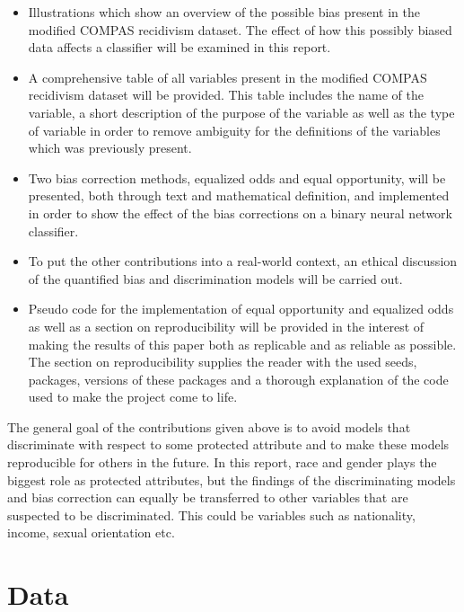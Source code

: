 \documentclass[11pt, fleqn, titlepage]{article}
\begin{document}
	\begin{itemize}
		\item Illustrations which show an overview of the possible bias present in the modified COMPAS recidivism dataset. The effect of how this possibly biased data affects a classifier will be examined in this report. 
		\item A comprehensive table of all variables present in the modified COMPAS recidivism dataset will be provided. This table includes the name of the variable, a short description of the purpose of the variable as well as the type of variable in order to remove ambiguity for the definitions of the variables which was previously present.
		\item Two bias correction methods, equalized odds and equal opportunity, will be presented, both through text and mathematical definition, and implemented in order to show the effect of the bias corrections on a binary neural network classifier.
		\item To put the other contributions into a real-world context, an ethical discussion of the quantified bias and discrimination models will be carried out.
		\item Pseudo code for the implementation of equal opportunity and equalized odds as well as a section on reproducibility will be provided in the interest of making the results of this paper both as replicable and as reliable as possible. The section on reproducibility supplies the reader with the used seeds, packages, versions of these packages and a thorough explanation of the code used to make the project come to life.
	\end{itemize}
	The general goal of the contributions given above is to avoid models that discriminate with respect to some protected attribute and to make these models reproducible for others in the future. In this report, race and gender plays the biggest role as protected attributes, but the findings of the discriminating models and bias correction can equally be transferred to other variables that are suspected to be discriminated. This could be variables such as nationality, income, sexual orientation etc.
	
	\section{Data} \label{data}
	
\end{document}
